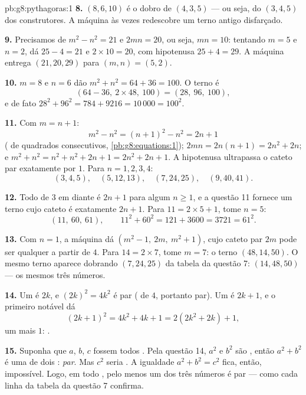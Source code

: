 \begin{solution}{pb:g8:pythagoras:1}
\textbf{8.} $(8, 6, 10)$ é o dobro de $(4, 3, 5)$ --- ou seja, do
$(3, 4, 5)$ dos construtores. A máquina às vezes redescobre um terno
antigo disfarçado.

\textbf{9.} Precisamos de $m^2 - n^2 = 21$ e $2mn = 20$, ou seja,
$mn = 10$: tentando $m = 5$ e $n = 2$, dá $25 - 4 = 21$ e
$2 \times 10 = 20$, com hipotenusa $25 + 4 = 29$. A máquina entrega
$(21, 20, 29)$ para $(m, n) = (5, 2)$.

\textbf{10.} $m = 8$ e $n = 6$ dão $m^2 + n^2 = 64 + 36 = 100$. O
terno é
\[
\left(64 - 36,\ 2 \times 48,\ 100\right) = (28,\ 96,\ 100),
\]
e de fato $28^2 + 96^2 = 784 + 9216 = 10\,000 = 100^2$.

\textbf{11.} Com $m = n + 1$:
\[
m^2 - n^2 = (n + 1)^2 - n^2 = 2n + 1
\]
( de quadrados consecutivos, \cref{pb:g8:equations:1});
$2mn = 2n(n + 1) = 2n^2 + 2n$; e
$m^2 + n^2 = n^2 + n^2 + 2n + 1 = 2n^2 + 2n + 1$. A hipotenusa
ultrapassa o cateto par exatamente por $1$. Para $n = 1, 2, 3, 4$:
\[
(3, 4, 5), \quad (5, 12, 13), \quad (7, 24, 25), \quad
(9, 40, 41) .
\]

\textbf{12.} Todo  de $3$ em diante é $2n + 1$ para algum
$n \geq 1$, e a questão 11 fornece um terno cujo cateto  é
exatamente $2n + 1$. Para $11 = 2 \times 5 + 1$, tome $n = 5$:
\[
(11,\ 60,\ 61),
\qquad
11^2 + 60^2 = 121 + 3600 = 3721 = 61^2 .
\]

\textbf{13.} Com $n = 1$, a máquina dá
$\left(m^2 - 1,\ 2m,\ m^2 + 1\right)$, cujo cateto par $2m$ pode ser
qualquer  a partir de $4$. Para $14 = 2 \times 7$, tome
$m = 7$: o terno $(48, 14, 50)$. O mesmo terno aparece dobrando
$(7, 24, 25)$ da tabela da questão 7: $(14, 48, 50)$ --- os mesmos três
números.

\textbf{14.} Um  é $2k$, e $(2k)^2 = 4k^2$ é par ( de
$4$, portanto par). Um  é $2k + 1$, e o primeiro 
notável dá
\[
(2k + 1)^2 = 4k^2 + 4k + 1 = 2\left(2k^2 + 2k\right) + 1 ,
\]
um  mais $1$: .

\textbf{15.} Suponha que $a$, $b$, $c$ fossem todos . Pela
questão 14, $a^2$ e $b^2$ são , então $a^2 + b^2$ é uma  de
dois : \emph{par}. Mas $c^2$ seria \emph{}. A
igualdade $a^2 + b^2 = c^2$ fica, então, impossível. Logo, em todo
, pelo menos um dos três números é par --- como cada
linha da tabela da questão 7 confirma.
\end{solution}
